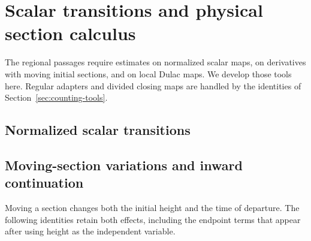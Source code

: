\section{Scalar transitions and physical section calculus}

The regional passages require estimates on normalized scalar maps, on
derivatives with moving initial sections, and on local Dulac maps. We
develop those tools here. Regular adapters and divided closing maps are
handled by the identities of Section~\ref{sec:counting-tools}.

\subsection{Normalized scalar transitions}


\subsection{Moving-section variations and inward continuation}

Moving a section changes both the initial height and the time of
departure. The following identities retain both effects, including the
endpoint terms that appear after using height as the independent variable.

